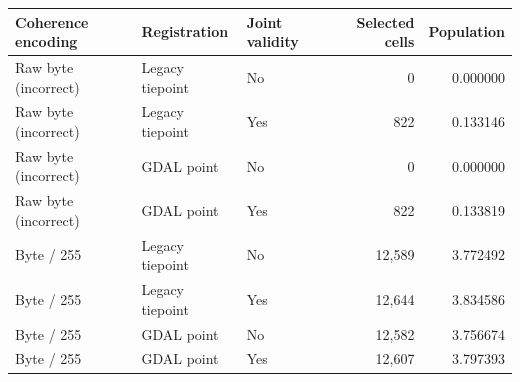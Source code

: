 \begin{tabular}{lllrr}\toprule
Coherence encoding & Registration & Joint validity & Selected cells & Population\\\midrule
Raw byte (incorrect) & Legacy tiepoint & No & 0 & 0.000000 \\
Raw byte (incorrect) & Legacy tiepoint & Yes & 822 & 0.133146 \\
Raw byte (incorrect) & GDAL point & No & 0 & 0.000000 \\
Raw byte (incorrect) & GDAL point & Yes & 822 & 0.133819 \\
Byte / 255 & Legacy tiepoint & No & 12,589 & 3.772492 \\
Byte / 255 & Legacy tiepoint & Yes & 12,644 & 3.834586 \\
Byte / 255 & GDAL point & No & 12,582 & 3.756674 \\
Byte / 255 & GDAL point & Yes & 12,607 & 3.797393 \\
\bottomrule\end{tabular}
